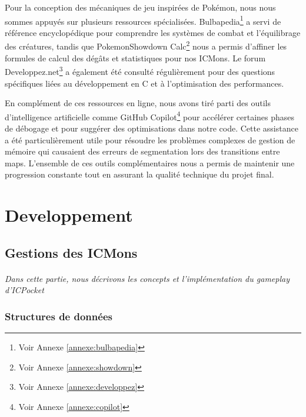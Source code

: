 \documentclass[12pt,a4paper, twoside]{article}
\begin{document}
Pour la conception des mécaniques de jeu inspirées de Pokémon, nous nous sommes appuyés sur plusieurs ressources spécialisées. Bulbapedia\footnote{Voir Annexe \ref{annexe:bulbapedia}} a servi de référence encyclopédique pour comprendre les systèmes de combat et l'équilibrage des créatures, tandis que PokemonShowdown Calc\footnote{Voir Annexe \ref{annexe:showdown}} nous a permis d'affiner les formules de calcul des dégâts et statistiques pour nos ICMons. Le forum Developpez.net\footnote{Voir Annexe \ref{annexe:developpez}} a également été consulté régulièrement pour des questions spécifiques liées au développement en C et à l'optimisation des performances.

En complément de ces ressources en ligne, nous avons tiré parti des outils d'intelligence artificielle comme GitHub Copilot\footnote{Voir Annexe \ref{annexe:copilot}} pour accélérer certaines phases de débogage et pour suggérer des optimisations dans notre code. Cette assistance a été particulièrement utile pour résoudre les problèmes complexes de gestion de mémoire qui causaient des erreurs de segmentation lors des transitions entre maps. L'ensemble de ces outils complémentaires nous a permis de maintenir une progression constante tout en assurant la qualité technique du projet final.
\newpage

\section{Developpement}
\subsection{Gestions des ICMons}
\paragraph{} \emph{Dans cette partie, nous décrivons les concepts et l'implémentation du gameplay d'ICPocket}
    \subsubsection{Structures de données}
\end{document}

